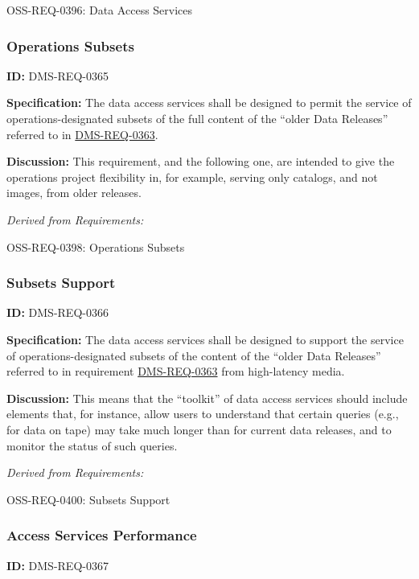 \documentclass[SE,toc,lsstdraft]{lsstdoc}
\begin{document}
OSS-REQ-0396:
Data Access Services \newline

\subsubsection{Operations Subsets}

\label{DMS-REQ-0365}
\textbf{ID:} DMS-REQ-0365

\textbf{Specification:}
The data access services shall be designed to permit the service of operations-designated subsets of the full content of the “older Data Releases” referred to in \hyperref[DMS-REQ-0363]{DMS-REQ-0363}.

\textbf{Discussion:}
This requirement, and the following one, are intended to give the operations project flexibility in, for example, serving only catalogs, and not images, from older releases.

\emph{Derived from Requirements:}

OSS-REQ-0398:
Operations Subsets \newline

\subsubsection{Subsets Support}

\label{DMS-REQ-0366}
\textbf{ID:} DMS-REQ-0366

\textbf{Specification:}
The data access services shall be designed to support the service of operations-designated subsets of the content of the “older Data Releases” referred to in requirement \hyperref[DMS-REQ-0363]{DMS-REQ-0363} from high-latency media.

\textbf{Discussion:}
This means that the “toolkit” of data access services should include elements that, for instance, allow users to understand that certain queries (e.g., for data on tape) may take much longer than for current data releases, and to monitor the status of such queries.

\emph{Derived from Requirements:}

OSS-REQ-0400:
Subsets Support \newline

\subsubsection{Access Services Performance}

\label{DMS-REQ-0367}
\textbf{ID:} DMS-REQ-0367
\end{document}
